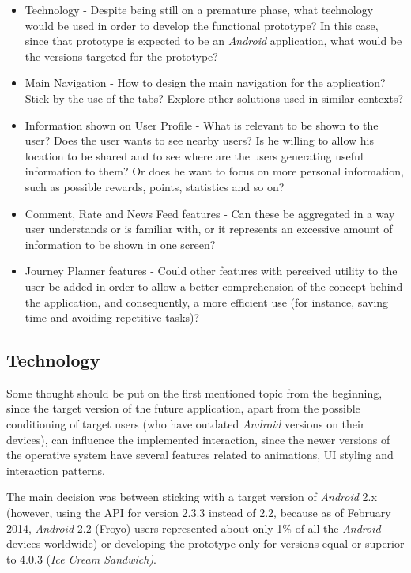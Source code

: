 \begin{itemize}
\item Technology - Despite being still on a premature phase, what technology would be used in order to develop the functional prototype? In this case, since that prototype is expected to be an \emph{Android} application, what would be the versions targeted for the prototype?

\item Main Navigation - How to design the main navigation for the application? Stick by the use of the tabs? Explore other solutions used in similar contexts? 

\item Information shown on User Profile - What is relevant to be shown to the user? Does the user wants to see nearby users? Is he willing to allow his location to be shared and to see where are the users generating useful information to them? Or does he want to focus on more personal information, such as possible rewards, points, statistics and so on?

\item Comment, Rate and News Feed features - Can these be aggregated in a way user understands or is familiar with, or it represents an excessive amount of information to be shown in one screen? 

\item Journey Planner features - Could other features with perceived utility to the user be added in order to allow a better comprehension of the concept behind the application, and consequently, a more efficient use (for instance, saving time and avoiding repetitive tasks)?
\end{itemize}

\subsection{Technology}
Some thought should be put on the first mentioned topic from the beginning, since the target version of the future application, apart from the possible conditioning of target users (who have outdated \emph{Android} versions on their devices), can influence the implemented interaction, since the newer versions of the operative system have several features related to animations, UI styling and interaction patterns.

The main decision was between sticking with a target version of \emph{Android} 2.x (however, using the API for version 2.3.3 instead of 2.2, because as of February 2014, \emph{Android} 2.2 (Froyo) users represented about only 1\% of all the \emph{Android} devices worldwide) or developing the prototype only for versions equal or superior to 4.0.3 (\emph{Ice Cream Sandwich)}. 

